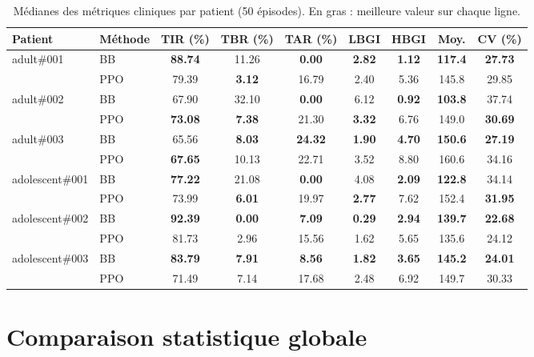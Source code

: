 \documentclass[a4paper,12pt]{report}
\begin{document}
\begin{table}[H]
\centering
\caption{Médianes des métriques cliniques par patient (50 épisodes). En gras : meilleure valeur sur chaque ligne.}
\label{tab:per_patient}
\small
\begin{tabular}{llccccccc}
\toprule
\textbf{Patient} & \textbf{Méthode} & \textbf{TIR (\%)} & \textbf{TBR (\%)} & \textbf{TAR (\%)} & \textbf{LBGI} & \textbf{HBGI} & \textbf{Moy.} & \textbf{CV (\%)} \\
\midrule
\multirow{2}{*}{adult\#001}
  & BB  & \textbf{88.74} & 11.26 & \textbf{0.00} & \textbf{2.82} & \textbf{1.12} & \textbf{117.4} & \textbf{27.73} \\
  & PPO & 79.39 & \textbf{3.12} & 16.79 & 2.40 & 5.36 & 145.8 & 29.85 \\
\midrule
\multirow{2}{*}{adult\#002}
  & BB  & 67.90 & 32.10 & \textbf{0.00} & 6.12 & \textbf{0.92} & \textbf{103.8} & 37.74 \\
  & PPO & \textbf{73.08} & \textbf{7.38} & 21.30 & \textbf{3.32} & 6.76 & 149.0 & \textbf{30.69} \\
\midrule
\multirow{2}{*}{adult\#003}
  & BB  & 65.56 & \textbf{8.03} & \textbf{24.32} & \textbf{1.90} & \textbf{4.70} & \textbf{150.6} & \textbf{27.19} \\
  & PPO & \textbf{67.65} & 10.13 & 22.71 & 3.52 & 8.80 & 160.6 & 34.16 \\
\midrule
\multirow{2}{*}{adolescent\#001}
  & BB  & \textbf{77.22} & 21.08 & \textbf{0.00} & 4.08 & \textbf{2.09} & \textbf{122.8} & 34.14 \\
  & PPO & 73.99 & \textbf{6.01} & 19.97 & \textbf{2.77} & 7.62 & 152.4 & \textbf{31.95} \\
\midrule
\multirow{2}{*}{adolescent\#002}
  & BB  & \textbf{92.39} & \textbf{0.00} & \textbf{7.09} & \textbf{0.29} & \textbf{2.94} & \textbf{139.7} & \textbf{22.68} \\
  & PPO & 81.73 & 2.96 & 15.56 & 1.62 & 5.65 & 135.6 & 24.12 \\
\midrule
\multirow{2}{*}{adolescent\#003}
  & BB  & \textbf{83.79} & \textbf{7.91} & \textbf{8.56} & \textbf{1.82} & \textbf{3.65} & \textbf{145.2} & \textbf{24.01} \\
  & PPO & 71.49 & 7.14 & 17.68 & 2.48 & 6.92 & 149.7 & 30.33 \\
\bottomrule
\end{tabular}
\end{table}

\section{Comparaison statistique globale}
\end{document}
